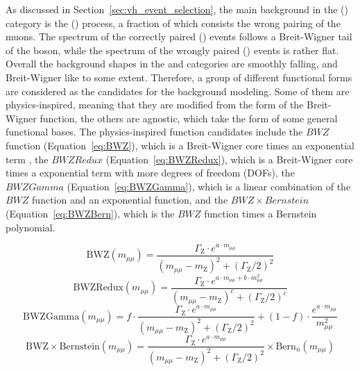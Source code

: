 As discussed in Section~\ref{sec:vh_event_selection}, the main background in the \WH (\ZH) category is the \WZ (\ZZ) process, 
a fraction of which consists the wrong pairing of the muons.
The \mmm spectrum of the correctly paired \WZ (\ZZ) events follows a Breit-Wigner tail of the \PZ boson, 
while the spectrum of the wrongly paired \WZ (\ZZ) events is rather flat.
Overall the background shapes in the \WH and \ZH categories are smoothly falling, and Breit-Wigner like to some extent.
Therefore, a group of different functional forms are considered as the candidates for the background modeling.
Some of them are physics-inspired, meaning that they are modified from the form of the Breit-Wigner function, 
the others are agnostic, which take the form of some general functional bases.
The physics-inspired function candidates include the $BWZ$ function (Equation~\ref{eq:BWZ}), which is a Breit-Wigner core times an exponential term , 
the $BWZRedux$ (Equation~\ref{eq:BWZRedux}), which is a Breit-Wigner core times a exponential term with more degrees of freedom (DOFs),
the $BWZGamma$ (Equation~\ref{eq:BWZGamma}), which is a linear combination of the $BWZ$ function and an exponential function,
and the $BWZ \times Bernstein$ (Equation~\ref{eq:BWZBern}), which is the $BWZ$ function times a Bernstein polynomial. 


\begin{equation}\label{eq:BWZ}
   \mathrm{BWZ}(m_{\mu\mu}) = \frac{\Gamma_{\mathrm{Z}} \cdot e^{a\cdot m_{\mu\mu}}}{(m_{\mu\mu}-m_{\mathrm{Z}})^2+(\Gamma_{\mathrm{Z}}/2)^{2}}
\end{equation}
\begin{equation}\label{eq:BWZRedux}
   \mathrm{BWZRedux}(m_{\mu\mu}) = \frac{\Gamma_{\mathrm{Z}} \cdot e^{a\cdot m_{\mu\mu}+b \cdot m_{\mu\mu}^2}}{(m_{\mu\mu}-m_{\mathrm{Z}})^c+(\Gamma_{\mathrm{Z}}/2)^{c}}
\end{equation}
\begin{equation}\label{eq:BWZGamma}
   \mathrm{BWZGamma}(m_{\mu\mu}) = f \cdot \frac{\Gamma_{\mathrm{Z}} \cdot e^{a\cdot m_{\mu\mu}}}{(m_{\mu\mu}-m_{\mathrm{Z}})^2+(\Gamma_{\mathrm{Z}}/2)^{2}} + (1-f) \cdot \frac{e^{a\cdot m_{\mu\mu}}}{m_{\mu\mu}^2}
\end{equation} 
\begin{equation}\label{eq:BWZBern}
  \mathrm{BWZ\times Bernstein}(m_{\mu\mu}) = \frac{\Gamma_{\mathrm{Z}} \cdot e^{a\cdot m_{\mu\mu}}}{(m_{\mu\mu}-m_{\mathrm{Z}})^2+(\Gamma_{\mathrm{Z}}/2)^{2}} \times \mathrm{Bern}_{n}(m_{\mu\mu})
\end{equation}

